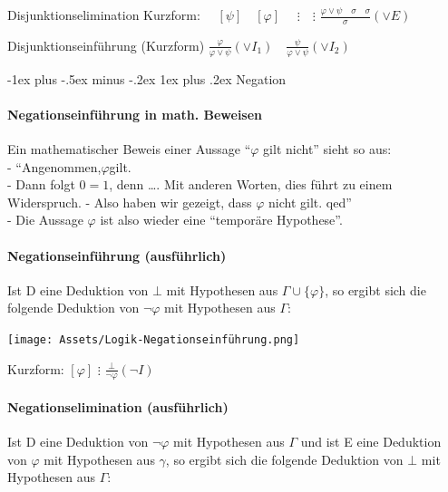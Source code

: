 \documentclass[a4paper]{article}
\makeatletter
\renewcommand{\subsubsection}{\@startsection{subsubsection}{3}{0mm}%
                {-1ex plus -.5ex minus -.2ex}%
                {1ex plus .2ex}%
                {\normalfont\small\bfseries}}
\makeatother
\begin{document}
\begin{multicols}{3}
  Disjunktionselimination Kurzform: $\quad [\psi] \quad[\varphi]$
  $\quad \vdots \quad\vdots$
  $\frac{\varphi\vee\psi \quad\sigma \quad\sigma}{\sigma} (\vee E)$

  Disjunktionseinführung (Kurzform)
  $\frac{\varphi}{\varphi\vee\psi} (\vee I_1) \quad \frac{\psi}{\varphi\vee\psi} (\vee I_2)$

  \subsubsection{Negation}\label{negation}

  \paragraph{Negationseinführung in math.
    Beweisen}\label{negationseinfuxfchrung-in-math.-beweisen}

  Ein mathematischer Beweis einer Aussage ``$\varphi$ gilt nicht'' sieht
  so aus:\\- ``Angenommen,$\varphi$gilt.\\- Dann folgt $0=1$, denn
  \ldots{}. Mit anderen Worten, dies führt zu einem Widerspruch. - Also
  haben wir gezeigt, dass $\varphi$ nicht gilt. qed''\\- Die Aussage
  $\varphi$ ist also wieder eine ``temporäre Hypothese''.

  \paragraph{Negationseinführung
    (ausführlich)}\label{negationseinfuxfchrung-ausfuxfchrlich}

  Ist D eine Deduktion von $\bot$ mit Hypothesen aus
  $\Gamma\cup\{\varphi\}$, so ergibt sich die folgende Deduktion von
  $\lnot\varphi$ mit Hypothesen aus $\Gamma$:


  \texttt{[image: Assets/Logik-Negationseinführung.png]}

  Kurzform: $[\varphi]$ $\vdots$ $\frac{\bot}{\lnot\varphi} (\lnot I)$

  \paragraph{Negationselimination
    (ausführlich)}\label{negationselimination-ausfuxfchrlich}

  Ist D eine Deduktion von $\lnot\varphi$ mit Hypothesen aus $\Gamma$ und
  ist E eine Deduktion von $\varphi$ mit Hypothesen aus $\gamma$, so
  ergibt sich die folgende Deduktion von $\bot$ mit Hypothesen aus
  $\Gamma$:



\end{multicols}
\end{document}
